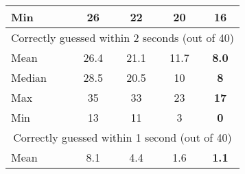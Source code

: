 \begin{table}
\begin{tabular}{|l|c|c|c|c|}
\cellcolor[HTML]{FDE7E5}Min            & \cellcolor[HTML]{FDE7E5}26                                          & \cellcolor[HTML]{FDE7E5}22                                         & \cellcolor[HTML]{FDE7E5}20                                & \cellcolor[HTML]{FDE7E5}\textbf{16}                           \\ \hline
\multicolumn{5}{|c|}{\cellcolor[HTML]{DEFDDE}Correctly guessed within 2 seconds (out of 40)}                                                                                                                                                                                                                  \\ \hline
\cellcolor[HTML]{DEFDDE}Mean           & \cellcolor[HTML]{DEFDDE}26.4                                        & \cellcolor[HTML]{DEFDDE}21.1                                       & \cellcolor[HTML]{DEFDDE}11.7                              & \cellcolor[HTML]{DEFDDE}\textbf{8.0}                          \\ \hline
\cellcolor[HTML]{DEFDDE}Median         & \cellcolor[HTML]{DEFDDE}28.5                                        & \cellcolor[HTML]{DEFDDE}20.5                                       & \cellcolor[HTML]{DEFDDE}10                                & \cellcolor[HTML]{DEFDDE}\textbf{8}                            \\ \hline
\cellcolor[HTML]{DEFDDE}Max            & \cellcolor[HTML]{DEFDDE}35                                          & \cellcolor[HTML]{DEFDDE}33                                         & \cellcolor[HTML]{DEFDDE}23                                & \cellcolor[HTML]{DEFDDE}\textbf{17}                           \\ \hline
\cellcolor[HTML]{DEFDDE}Min            & \cellcolor[HTML]{DEFDDE}13                                          & \cellcolor[HTML]{DEFDDE}11                                         & \cellcolor[HTML]{DEFDDE}3                                 & \cellcolor[HTML]{DEFDDE}\textbf{0}                            \\ \hline
\multicolumn{5}{|c|}{\cellcolor[HTML]{ECF4FF}Correctly guessed within 1 second (out of 40)}                                                                                                                                                                                                                   \\ \hline
\cellcolor[HTML]{ECF4FF}Mean           & \cellcolor[HTML]{ECF4FF}8.1                                         & \cellcolor[HTML]{ECF4FF}4.4                                        & \cellcolor[HTML]{ECF4FF}1.6                               & \cellcolor[HTML]{ECF4FF}\textbf{1.1}                          \\ \hline

\end{tabular}
\end{table}
